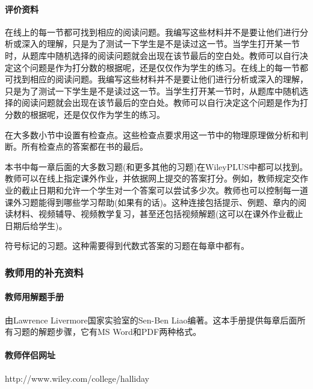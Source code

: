 \paragraph{评价资料}

\begin{UnnumberedItem}
\item 在线上的每一节都可找到相应的阅读问题。我编写这些材料并不是要让他们进行分析或深入的理解，只是为了测试一下学生是不是读过这一节。当学生打开某一节时，从题库中随机选择的阅读问题就会出现在该节最后的空白处。教师可以自行决定这个问题是作为打分数的根据呢，还是仅仅作为学生的练习。在线上的每一节都可找到相应的阅读问题。我编写这些材料并不是要让他们进行分析或深入的理解，只是为了测试一下学生是不是读过这一节。当学生打开某一节时，从题库中随机选择的阅读问题就会出现在该节最后的空白处。教师可以自行决定这个问题是作为打分数的根据呢，还是仅仅作为学生的练习。

\item 在大多数小节中设置有检查点。这些检查点要求用这一节中的物理原理做分析和判断。所有检查点的答案都在书的最后。

\item 本书中每一章后面的大多数习题(和更多其他的习题)在WileyPLUS中都可以找到。教师可以在线上指定课外作业，并依据网上提交的答案打分。例如，教师规定交作业的截止日期和允许一个学生对一个答案可以尝试多少次。教师也可以控制每一道课外习题能得到哪些学习帮助(如果有的话)。这种连接包括提示、例题、章内的阅读材料、视频辅导、视频教学复习，甚至还包括视频解题(这可以在课外作业截止日期后给学生)。

\item 符号标记的习题。这种需要得到代数式答案的习题在每章中都有。
\end{UnnumberedItem}




\subsubsection*{教师用的补充资料}

\paragraph{教师用解题手册}由Lawrence Livermore国家实验室的Sen-Ben Liao编著。这本手册提供每章后面所有习题的解题步骤，它有MS Word和PDF两种格式。

\paragraph{教师伴侣网址}http://www.wiley.com/college/halliday

